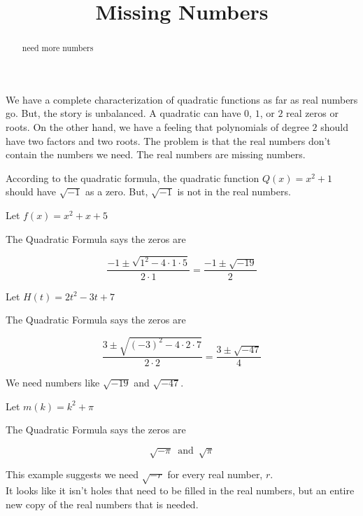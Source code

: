 \documentclass{ximera}
\title{Missing Numbers}
\begin{document}
\begin{abstract}
need more numbers
\end{abstract}
\maketitle




We have a complete characterization of quadratic functions as far as real numbers go.  But, the story is unbalanced.  A quadratic can have $0$, $1$, or $2$ real zeros or roots.  On the other hand, we have a feeling that polynomials of degree $2$ should have two factors and two roots.  The problem is that the real numbers don't contain the numbers we need.  The real numbers are missing numbers.


According to the quadratic formula, the quadratic function $Q(x) = x^2 + 1$ should have $\sqrt{-1}$ as a zero.  But, $\sqrt{-1}$ is not in the real numbers. 




\begin{example}  
   
  
Let $f(x) = x^2 + x + 5$


The Quadratic Formula says the zeros are 


\[
\frac{-1 \pm \sqrt{1^2 - 4 \cdot 1 \cdot 5}}{2 \cdot 1} = \frac{-1 \pm \sqrt{-19}}{2}
\]


\end{example}






\begin{example}  
   
  
Let $H(t) = 2t^2 - 3t + 7$


The Quadratic Formula says the zeros are 


\[
\frac{3 \pm \sqrt{(-3)^2 - 4 \cdot 2 \cdot 7}}{2 \cdot 2} = \frac{3 \pm \sqrt{-47}}{4}
\]


\end{example}



We need numbers like $\sqrt{-19}$ and $\sqrt{-47}$. \\









\begin{example}  
   
  
Let $m(k) = k^2 + \pi $


The Quadratic Formula says the zeros are 


\[
\sqrt{-\pi} \, \text{ and } \, \sqrt{\pi}
\]


\end{example}




This example suggests we need $\sqrt{-r}$ for every real number, $r$. \\





It looks like it isn't holes that need to be filled in the real numbers, but an entire new copy of the real numbers that is needed.
\end{document}

